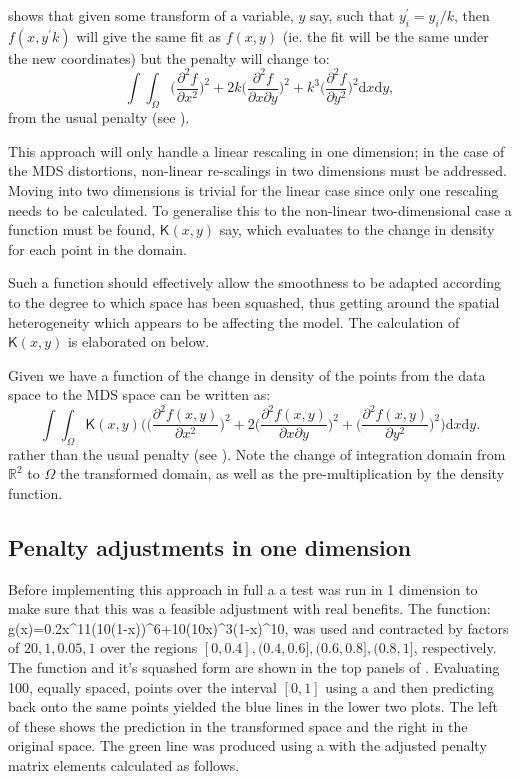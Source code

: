 \cite{wood2000} shows that given some transform of a variable, $y$ say, such that $y_i^\prime=y_i/k$, then $f(x,y^\prime k)$ will give the same fit as $f(x,y)$ (ie. the fit will be the same under the new coordinates) but the penalty will change to:
\begin{equation}
\int\int_\Omega \Big( \frac{\partial^2 f}{\partial x^2} \Big)^2 + 2k\Big( \frac{\partial^2 f}{\partial x \partial y} \Big)^2 + k^3\Big( \frac{\partial^2 f}{\partial y^2} \Big)^2 \text{d}x \text{d}y,
\label{adjustedintegral}
\end{equation}
from the usual \tprs penalty (see ).

This approach will only handle a linear rescaling in one dimension; in the case of the MDS distortions, non-linear re-scalings in two dimensions must be addressed. Moving into two dimensions is trivial for the linear case since only one rescaling needs to be calculated. To generalise this to the non-linear two-dimensional case a function must be found, $\mathsf{K}(x,y)$ say, which evaluates to the change in density for each point in the domain. 

Such a function should effectively allow the smoothness to be adapted according to the degree to which space has been squashed, thus getting around the spatial heterogeneity which appears to be affecting the model. The calculation of $\mathsf{K}(x,y)$ is elaborated on below.

Given we have a function of the change in density of the points from the data space to the MDS space  can be written as:
\begin{equation}
\int\int_\Omega \mathsf{K}(x,y) \Big( \Big(\frac{\partial^2 f(x,y)}{\partial x^2}\Big)^2 + 2\Big(\frac{\partial^2 f(x,y)}{\partial x \partial y}\Big)^2 + \Big(\frac{\partial^2 f(x,y)}{\partial y^2}\Big)^2\Big) \text{d}x\text{d}y.
\label{kdeadjust}
\end{equation}
rather than the usual \tprs penalty (see ). Note the change of integration domain from $\mathbb{R}^2$ to $\Omega$ the transformed domain, as well as the pre-multiplication by the density function.

\subsection{Penalty adjustments in one dimension}

Before implementing this approach in full a a test was run in 1 dimension to make sure that this was a feasible adjustment with real benefits. The function:
\be
g(x)=0.2x^{11}(10(1-x))^6+10(10x)^3(1-x)^{10},
\label{hardfcn}
\ee
was used and contracted by factors of $20,1,0.05,1$ over the regions $[0,0.4], (0.4,0.6],(0.6,0.8],(0.8,1]$, respectively. The function and it's squashed form are shown in the top panels of . Evaluating 100, equally spaced, points over the interval $[0,1]$ using a \tprs and then predicting back onto the same points yielded the blue lines in the lower two plots. The left of these shows the prediction in the transformed space and the right in the original space. The green line was produced using a \tprs with the adjusted penalty matrix elements calculated as follows.

